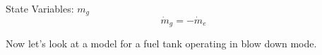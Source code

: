 \noindent State Variables:  $m_g$
%
\begin{equation}
    \dot{m}_g = -\dot{m}_e
\end{equation}

Now let's look at a model for a fuel tank operating in blow down
mode.

%
%
%
%
